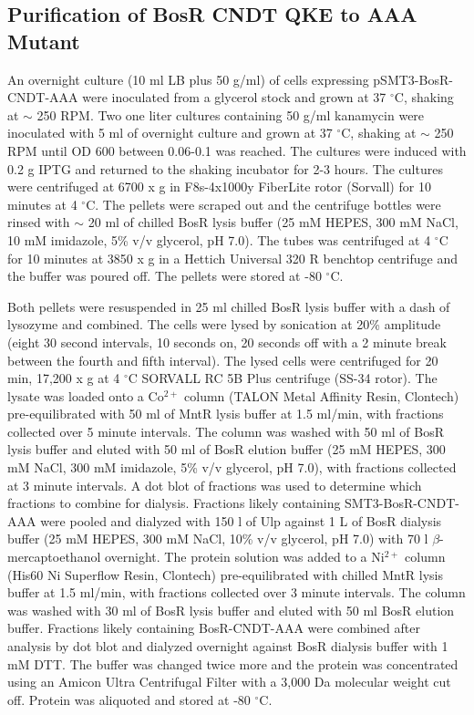 \documentclass[12pt,twoside]{reedthesis}
\begin{document}
\subsection{Purification of BosR CNDT QKE to AAA Mutant}

An overnight culture (10 ml LB plus 50 \micro g/ml) of cells expressing pSMT3-BosR-CNDT-AAA were inoculated from a glycerol stock and grown at 37 $^\circ$C, shaking at $\sim$ 250 RPM. Two one liter cultures containing 50 \micro g/ml kanamycin were inoculated with 5 ml of overnight culture and grown at 37 $^\circ$C, shaking at $\sim$ 250 RPM until OD 600 between 0.06-0.1 was reached. The cultures were induced with 0.2 g IPTG and returned to the shaking incubator for 2-3 hours. The cultures were centrifuged at 6700 x g in F8s-4x1000y FiberLite\textsuperscript{\textregistered} rotor (Sorvall) for 10 minutes at 4 $^\circ$C. The pellets were scraped out and the centrifuge bottles were rinsed with $\sim$ 20 ml of chilled BosR lysis buffer (25 mM HEPES, 300 mM NaCl, 10 mM imidazole, 5\% v/v glycerol, pH 7.0). The tubes was centrifuged at 4 $^\circ$C for 10 minutes at 3850 x g in a Hettich Universal 320 R benchtop centrifuge and the buffer was poured off. The pellets were stored at -80 $^\circ$C. 

Both pellets were resuspended in 25 ml chilled BosR lysis buffer with a dash of lysozyme and combined. The cells were lysed by sonication at 20\% amplitude (eight 30 second intervals, 10 seconds on, 20 seconds off with a 2 minute break between the fourth and fifth interval). The lysed cells were centrifuged for 20 min, 17,200 x g at 4 $^\circ$C SORVALL\textsuperscript{\textregistered} RC 5B Plus centrifuge (SS-34 rotor). The lysate was loaded onto a Co$^{2+}$ column (TALON\textsuperscript{\textregistered} Metal Affinity Resin, Clontech) pre-equilibrated with 50 ml of MntR lysis buffer at 1.5 ml/min, with fractions collected over 5 minute intervals. The column was washed with 50 ml of BosR lysis buffer and eluted with 50 ml of BosR elution buffer (25 mM HEPES, 300 mM NaCl, 300 mM imidazole, 5\% v/v glycerol, pH 7.0), with fractions collected at 3 minute intervals. A dot blot of fractions was used to determine which fractions to combine for dialysis. Fractions likely containing SMT3-BosR-CNDT-AAA were pooled and dialyzed with 150 \micro l of Ulp against 1 L of BosR dialysis buffer (25 mM HEPES, 300 mM NaCl, 10\% v/v glycerol, pH 7.0) with 70 \micro l $\beta$-mercaptoethanol overnight. The protein solution was added to a Ni$^{2+}$ column (His60 Ni Superflow Resin, Clontech) pre-equilibrated with chilled MntR lysis buffer at 1.5 ml/min, with fractions collected over 3 minute intervals. The column was washed with 30 ml of BosR lysis buffer and eluted with 50 ml BosR elution buffer. Fractions likely containing BosR-CNDT-AAA were combined after analysis by dot blot and dialyzed overnight against BosR dialysis buffer with 1 mM DTT. The buffer was changed twice more and the protein was concentrated using an Amicon\textsuperscript{\textregistered} Ultra Centrifugal Filter with a 3,000 Da molecular weight cut off. Protein was aliquoted and stored at -80 $^{\circ}$C. 
\end{document}
